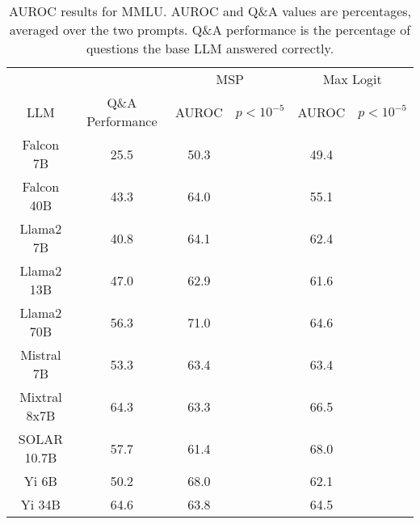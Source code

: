 \begin{table*}
\centering
\begin{tabular}{c|c|c|c|c|c}
& & \multicolumn{2}{c|}{MSP} & \multicolumn{2}{c}{Max Logit} \\ 
LLM & Q\&A Performance & AUROC & $p < 10^{-5}$ & AUROC & $p < 10^{-5}$\\ \hline
Falcon 7B & 25.5 & 50.3 &  & 49.4 & \\
Falcon 40B & 43.3 & 64.0 &  & 55.1 & \\
Llama2 7B & 40.8 & 64.1 &  & 62.4 & \\
Llama2 13B & 47.0 & 62.9 &  & 61.6 & \\
Llama2 70B & 56.3 & 71.0 &  & 64.6 & \\
Mistral 7B & 53.3 & 63.4 &  & 63.4 & \\
Mixtral 8x7B & 64.3 & 63.3 &  & 66.5 & \\
SOLAR 10.7B & 57.7 & 61.4 &  & 68.0 & \\
Yi 6B & 50.2 & 68.0 &  & 62.1 & \\
Yi 34B & 64.6 & 63.8 &  & 64.5 & \\
\hline
\end{tabular}
\caption{AUROC results for MMLU. AUROC and Q\&A values are percentages, averaged over the two prompts. Q\&A performance is the percentage of questions the base LLM answered correctly.}
\label{tab:mmlu_auroc}
\end{table*}
